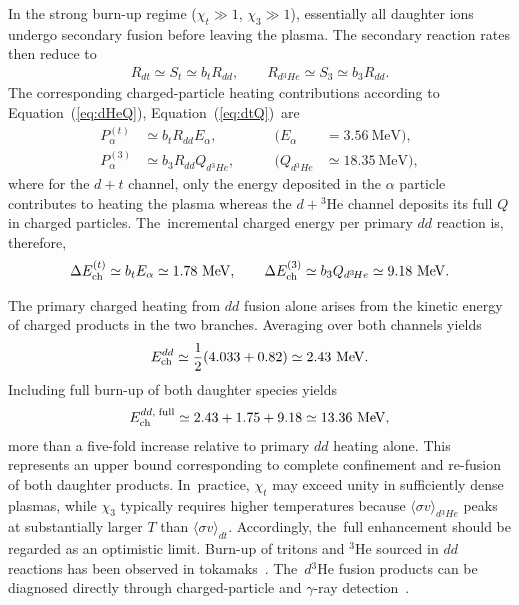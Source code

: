 \documentclass[particles,article,accept,pdftex,moreauthors]{Definitions/mdpi}
\newcommand*{\xblue}{}
\begin{document}
In the strong burn-up regime ($\chi_t\gg1$, $\chi_3\gg1$), essentially all daughter ions undergo secondary fusion before leaving the plasma. 
The secondary reaction rates then reduce to
\begin{align}
R_{dt} \simeq S_t \simeq b_t R_{dd},\qquad
R_{d{}^3\!He} \simeq S_3 \simeq b_3 R_{dd}.
\end{align}
The corresponding charged-particle heating contributions according to Equation~(\ref{eq:dHeQ}), \mbox{Equation~(\ref{eq:dtQ}) are}
\begin{align}
P_{\alpha}^{(t)} &\simeq b_t R_{dd} E_\alpha, 
\qquad &(E_\alpha &= 3.56~\mathrm{MeV}), \\
P_{\alpha}^{(3)} &\simeq b_3 R_{dd} Q_{d{}^3\!He},
\qquad &(Q_{d{}^3\!He}&\simeq 18.35~\mathrm{MeV}),
\end{align}
where for the $d+t$ channel, only the energy deposited in the $\alpha$ particle contributes to heating the plasma whereas the $d+{}^3\mathrm{He}$ channel deposits its full $Q$ in charged particles. The~incremental charged energy per primary $dd$ reaction is, therefore,
\begin{align}
\Delta E_{\rm ch}^{(t)}
\simeq b_t E_\alpha
\simeq 1.78~\mathrm{MeV},\qquad
\Delta E_{\rm ch}^{(3)}
\simeq b_3 Q_{d{}^3\!He}
\simeq 9.18~\mathrm{MeV}.
\end{align}

The primary charged heating from $dd$ fusion alone arises from the kinetic energy of charged products in the two branches. Averaging over both channels yields
\begin{align}
E_{\rm ch}^{dd}
\simeq \frac12(4.033 + 0.82)
\simeq 2.43~\mathrm{MeV}.
\end{align}
Including full burn-up of both daughter species yields
\begin{align}
E_{\rm ch}^{dd,\;{\rm full}}
\simeq 2.43 + 1.75 + 9.18
\simeq 13.36~\mathrm{MeV},
\end{align}
more than a five-fold increase relative to primary $dd$ heating alone. This represents an upper bound corresponding to complete confinement and re-fusion of both daughter products. In~practice, $\chi_t$ may exceed unity in sufficiently dense plasmas, while $\chi_3$ typically requires higher temperatures because $\langle\sigma v\rangle_{d{}^3\!He}$ peaks at substantially larger $T$ than $\langle\sigma v\rangle_{dt}$. Accordingly, the~full enhancement should be regarded as an optimistic limit. {\xblue Burn-up of tritons and ${}^3\mathrm{He}$ sourced in $dd$ reactions has been observed in tokamaks~\cite{heidbrink1983}. The~$d{}^3\mathrm{He}$ fusion products can be diagnosed directly through charged-particle and $\gamma$-ray detection~\cite{sharapov2016}.}
\end{document}
